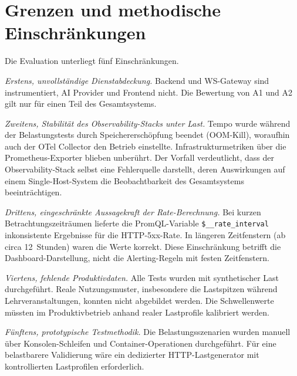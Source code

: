 \section{Grenzen und methodische Einschränkungen}

Die Evaluation unterliegt fünf Einschränkungen.

\emph{Erstens, unvollständige Dienstabdeckung.} Backend und WS-Gateway sind instrumentiert, AI Provider und Frontend nicht. Die Bewertung von A1 und A2 gilt nur für einen Teil des Gesamtsystems.

\emph{Zweitens, Stabilität des Observability-Stacks unter Last.} Tempo wurde während der Belastungstests durch Speichererschöpfung beendet (OOM-Kill), woraufhin auch der OTel Collector den Betrieb einstellte. Infrastrukturmetriken über die Prometheus-Exporter blieben unberührt. Der Vorfall verdeutlicht, dass der Observability-Stack selbst eine Fehlerquelle darstellt, deren Auswirkungen auf einem Single-Host-System die Beobachtbarkeit des Gesamtsystems beeinträchtigen.

\emph{Drittens, eingeschränkte Aussagekraft der Rate-Berechnung.} Bei kurzen Betrachtungszeiträumen lieferte die PromQL-Variable \texttt{\$\_\_rate\_interval} inkonsistente Ergebnisse für die HTTP-5xx-Rate. In längeren Zeitfenstern (ab circa 12~Stunden) waren die Werte korrekt. Diese Einschränkung betrifft die Dashboard-Darstellung, nicht die Alerting-Regeln mit festen Zeitfenstern.

\emph{Viertens, fehlende Produktivdaten.} Alle Tests wurden mit synthetischer Last durchgeführt. Reale Nutzungsmuster, insbesondere die Lastspitzen während Lehrveranstaltungen, konnten nicht abgebildet werden. Die Schwellenwerte müssten im Produktivbetrieb anhand realer Lastprofile kalibriert werden.

\emph{Fünftens, prototypische Testmethodik.} Die Belastungsszenarien wurden manuell über Konsolen-Schleifen und Container-Operationen durchgeführt. Für eine belastbarere Validierung wäre ein dedizierter HTTP-Lastgenerator mit kontrollierten Lastprofilen erforderlich.